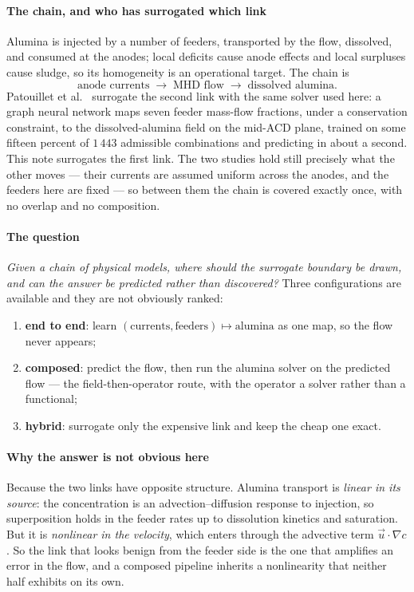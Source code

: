\documentclass[11pt,a4paper]{article}
\theoremstyle{plain}
\theoremstyle{definition}
\theoremstyle{remark}
\begin{document}
\paragraph{The chain, and who has surrogated which link}
Alumina is injected by a number of feeders, transported by the flow, dissolved,
and consumed at the anodes; local deficits cause anode effects and local
surpluses cause sludge, so its homogeneity is an operational target. The chain
is
\[
  \text{anode currents} \;\longrightarrow\;
  \text{MHD flow} \;\longrightarrow\;
  \text{dissolved alumina} .
\]
Patouillet et al.\ \cite{patouillet} surrogate the second link with the same
solver used here: a graph neural network maps seven feeder mass-flow fractions,
under a conservation constraint, to the dissolved-alumina field on the mid-ACD
plane, trained on some fifteen percent of $1\,443$ admissible combinations and
predicting in about a second. This note surrogates the first link. The two
studies hold still precisely what the other moves --- their currents are assumed
uniform across the anodes, and the feeders here are fixed --- so between them the
chain is covered exactly once, with no overlap and no composition.

\paragraph{The question}
\emph{Given a chain of physical models, where should the surrogate boundary be
drawn, and can the answer be predicted rather than discovered?} Three
configurations are available and they are not obviously ranked:
\begin{enumerate}
\item \textbf{end to end}: learn $(\text{currents},\text{feeders}) \mapsto
\text{alumina} $ as one map, so the flow never appears;
\item \textbf{composed}: predict the flow, then run the alumina solver on the
predicted flow --- the field-then-operator route, with the operator a solver
rather than a functional;
\item \textbf{hybrid}: surrogate only the expensive link and keep the cheap one
exact.
\end{enumerate}

\paragraph{Why the answer is not obvious here}
Because the two links have opposite structure. Alumina transport is
\emph{linear in its source}: the concentration is an advection--diffusion
response to injection, so superposition holds in the feeder rates up to
dissolution kinetics and saturation. But it is \emph{nonlinear in the velocity},
which enters through the advective term $\vec u\cdot\nabla c$. So the link that
looks benign from the feeder side is the one that amplifies an error in the flow,
and a composed pipeline inherits a nonlinearity that neither half exhibits on
its own.
\end{document}
